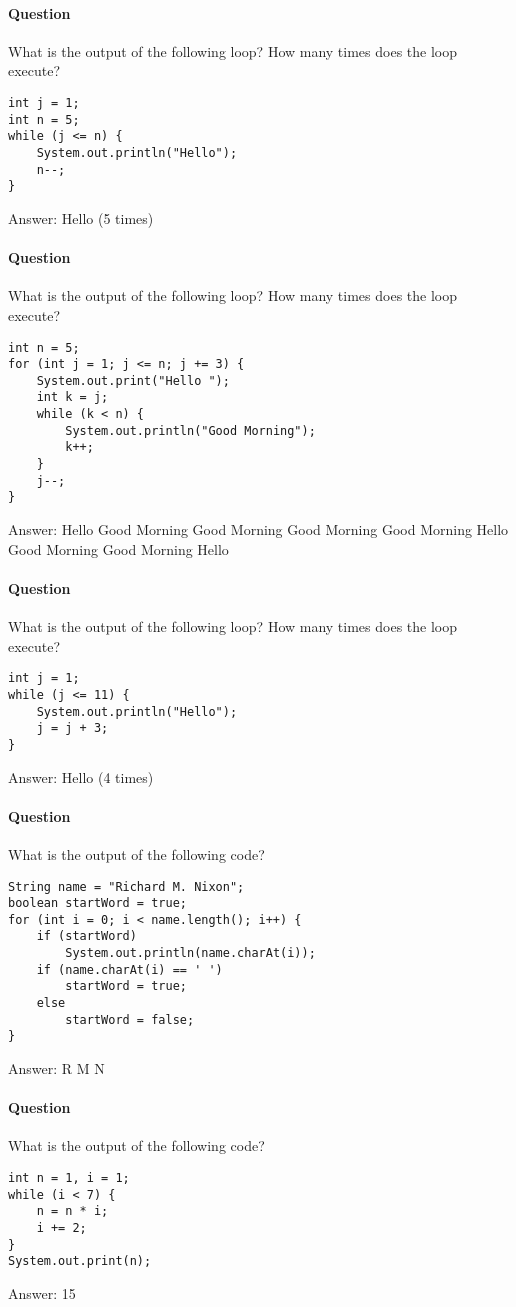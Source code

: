 \documentclass{article}
\begin{document}
\addtocounter{question_num}{1}
\paragraph{Question }
What is the output of the following loop? How many times does the loop execute?
\begin{lstlisting}
int j = 1;
int n = 5;
while (j <= n) {
	System.out.println("Hello");
	n--;
}
\end{lstlisting}
{\color{red}Answer: Hello (5 times)}

\addtocounter{question_num}{1}
\paragraph{Question }
What is the output of the following loop? How many times does the loop execute?
\begin{lstlisting}
int n = 5;
for (int j = 1; j <= n; j += 3) {
	System.out.print("Hello ");
	int k = j;
	while (k < n) {
		System.out.println("Good Morning");
		k++;
	}
	j--;
}
\end{lstlisting}
{\color{red}Answer:
\newline Hello Good Morning
\newline Good Morning
\newline Good Morning
\newline Good Morning
\newline Hello Good Morning
\newline Good Morning
\newline Hello
}

\addtocounter{question_num}{1}
\paragraph{Question }
What is the output of the following loop? How many times does the loop execute?
\begin{lstlisting}
int j = 1;
while (j <= 11) {
	System.out.println("Hello");
	j = j + 3;
}
\end{lstlisting}
{\color{red}Answer: Hello (4 times)}

\addtocounter{question_num}{1}
\paragraph{Question }
What is the output of the following code?
\begin{lstlisting}
String name = "Richard M. Nixon";
boolean startWord = true;
for (int i = 0; i < name.length(); i++) {
	if (startWord)
		System.out.println(name.charAt(i));
	if (name.charAt(i) == ' ')
		startWord = true;
	else
		startWord = false;
}
\end{lstlisting}
{\color{red}Answer: 
\newline R
\newline M
\newline N}

\addtocounter{question_num}{1}
\paragraph{Question }
What is the output of the following code?
\begin{lstlisting}
int n = 1, i = 1;
while (i < 7) {
	n = n * i;
	i += 2;
}
System.out.print(n);
\end{lstlisting}
{\color{red}Answer: 15}
\end{document}
